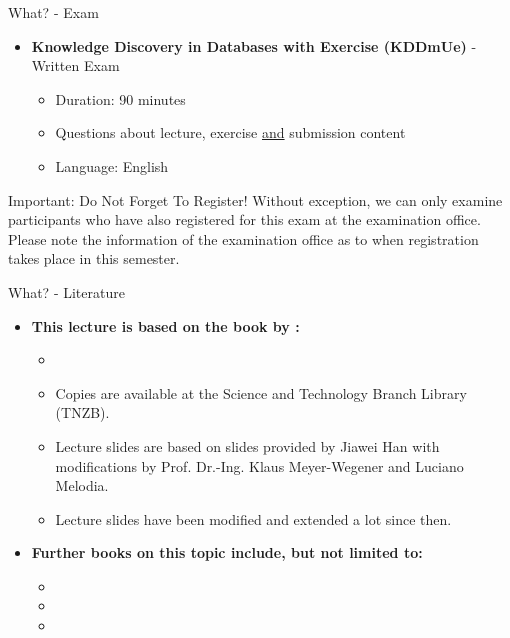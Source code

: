 \begin{frame}{What? - Exam}
	\begin{itemize}
		\item \textbf{Knowledge Discovery in Databases with Exercise (KDDmUe)} - {\color{faugray}Written Exam}
		      \begin{itemize}
			      \item Duration: 90 minutes
			      \item Questions about lecture, exercise \underline{and} submission content
			      \item Language: English
		      \end{itemize}
	\end{itemize}
	\begin{alertblock}{Important: Do Not Forget To Register!}
		Without exception, we can only examine participants who have also registered for this exam at the examination office. Please note the information of the examination office as to when registration takes place in this semester.
	\end{alertblock}
\end{frame}

\begin{frame}{What? - Literature}
	\begin{itemize}
		\item \textbf{This lecture is based on the book by \citeauthor{han2011}:}
		      \begin{itemize}
			      \item {}
			      \item {\color{faugray}Copies are available at the Science and Technology Branch Library (TNZB).}
			      \item Lecture slides are based on slides provided by Jiawei Han with modifications by Prof. Dr.-Ing. Klaus Meyer-Wegener and Luciano Melodia.
			      \item Lecture slides have been modified and extended a lot since then.
		      \end{itemize}
		\item \textbf{Further books on this topic include, but not limited to:}
		      \begin{itemize}
			      \item {}
			      \item {}
			      \item {}
		      \end{itemize}
	\end{itemize}
\end{frame}

